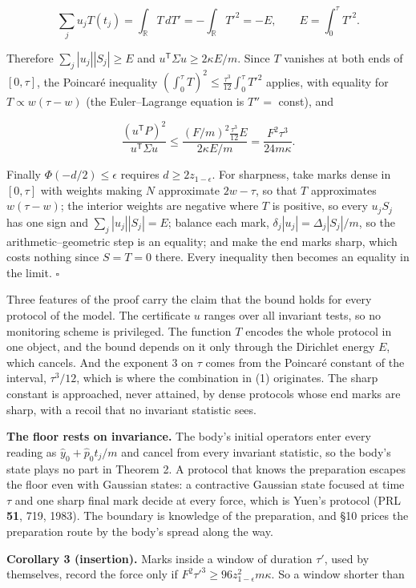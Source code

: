 \documentclass[11pt,a4paper]{article}
\begin{document}
\[\sum_ju_jT(t_j)=\int_{\mathbb R}T\,dT'=-\int_{\mathbb R}T'^2=-E,
\qquad E=\int_0^\tau T'^2 .\]

Therefore \(\sum_j|u_j||S_j|\ge E\) and
\(u^{\mathsf T}\Sigma u\ge2\kappa E/m\). Since \(T\) vanishes at both
ends of \([0,\tau]\), the Poincaré inequality
\((\int_0^\tau T)^2\le\frac{\tau^3}{12}\int_0^\tau T'^2\) applies, with
equality for \(T\propto w(\tau-w)\) (the Euler--Lagrange equation is
\(T''=\) const), and

\[\frac{(u^{\mathsf T}P)^2}{u^{\mathsf T}\Sigma u}
\le\frac{(F/m)^2\frac{\tau^3}{12}E}{2\kappa E/m}=\frac{F^2\tau^3}{24m\kappa}.\]

Finally \(\Phi(-d/2)\le\epsilon\) requires \(d\ge2z_{1-\epsilon}\). For
sharpness, take marks dense in \([0,\tau]\) with weights making \(N\)
approximate \(2w-\tau\), so that \(T\) approximates \(w(\tau-w)\); the
interior weights are negative where \(T\) is positive, so every
\(u_jS_j\) has one sign and \(\sum_j|u_j||S_j|=E\); balance each mark,
\(\delta_j|u_j|=\Delta_j|S_j|/m\), so the arithmetic--geometric step is
an equality; and make the end marks sharp, which costs nothing since
\(S=T=0\) there. Every inequality then becomes an equality in the limit.
\(\square\)

Three features of the proof carry the claim that the bound holds for
every protocol of the model. The certificate \(u\) ranges over all
invariant tests, so no monitoring scheme is privileged. The function
\(T\) encodes the whole protocol in one object, and the bound depends on
it only through the Dirichlet energy \(E\), which cancels. And the
exponent \(3\) on \(\tau\) comes from the Poincaré constant of the
interval, \(\tau^3/12\), which is where the combination in (1)
originates. The sharp constant is approached, never attained, by dense
protocols whose end marks are sharp, with a recoil that no invariant
statistic sees.

\textbf{The floor rests on invariance.} The body's initial operators
enter every reading as \(\hat y_0+\hat p_0t_j/m\) and cancel from every
invariant statistic, so the body's state plays no part in Theorem 2. A
protocol that knows the preparation escapes the floor even with Gaussian
states: a contractive Gaussian state focused at time \(\tau\) and one
sharp final mark decide at every force, which is Yuen's protocol (PRL
\textbf{51}, 719, 1983). The boundary is knowledge of the preparation,
and §10 prices the preparation route by the body's spread along the way.

\textbf{Corollary 3 (insertion).} Marks inside a window of duration
\(\tau'\), used by themselves, record the force only if
\(F^2\tau'^3\ge96z_{1-\epsilon}^2m\kappa\). So a window shorter than
\end{document}
